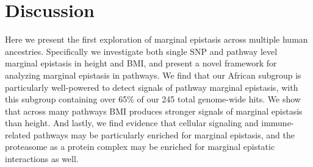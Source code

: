 \documentclass[12pt,a4paper]{article}
\begin{document}









\section{Discussion}\label{InterPath-Discussion}

Here we present the first exploration of marginal epistasis across multiple human ancestries. Specifically we investigate both single SNP and pathway level marginal epistasis in height and BMI, and present a novel framework for analyzing marginal epistasis in pathways. We find that our African subgroup is particularly well-powered to detect signals of pathway marginal epistasis, with this subgroup containing over 65\% of our 245 total genome-wide hits. We show that across many pathways BMI produces stronger signals of marginal epistasis than height. And lastly, we find evidence that cellular signaling and immune-related pathways may be particularly enriched for marginal epistasis, and the proteasome as a protein complex may be enriched for marginal epistatic interactions as well. 
\end{document}

